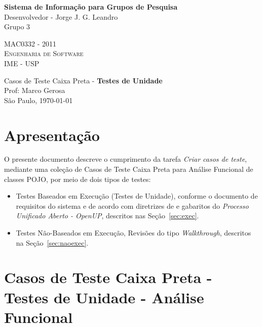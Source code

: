 \documentclass[11pt, a4paper]{book}
\begin{document}
\thispagestyle{empty}
\begin{center}
    \vspace*{0.2cm}
    \textbf{\Large{Sistema de Informação para Grupos de Pesquisa}}\\
	
    \vspace*{1.2cm}
    \Large{Desenvolvedor - Jorge J. G. Leandro}\\
    \Large{Grupo 3}
    
    \vskip 2cm
	\textsc{
	MAC0332 - 2011\\[-0.25cm] 
          	Engenharia de Software\\[-0.25cm] 	
	IME - USP\\[-0.25cm]
	}
    
    \vskip 1.5cm
    Casos de Teste Caixa Preta - \textbf{Testes de Unidade}\\
    Prof: Marco Gerosa\\

	
    \vskip 0.5cm
   {\normalsize São Paulo, \today}
\end{center}


\chapter[Apresentação]{Apresentação}
\label{cap:apresentacao}	
	
	 	O presente documento descreve o cumprimento da tarefa \emph{Criar casos de teste}, mediante uma coleção de Casos de Teste Caixa Preta para Análise Funcional de classes POJO, por meio de dois tipos de testes:

\begin{itemize}
 \item Testes Baseados em Execução (Testes de Unidade), conforme o documento de requisitos do sistema e de acordo com diretrizes de \citep{schach2007} e gabaritos do \emph{Processo Unificado Aberto - OpenUP}, descritos nas Seção~\ref{sec:exec}.

\item Testes Não-Baseados em Execução, Revisões do tipo \emph{Walkthrough}, descritos na Seção~\ref {sec:naoexec}.

\end{itemize}

\chapter[Casos de Teste]{Casos de Teste Caixa Preta - Testes de Unidade - Análise Funcional}
\label{cap:casosdeteste}
\end{document}
